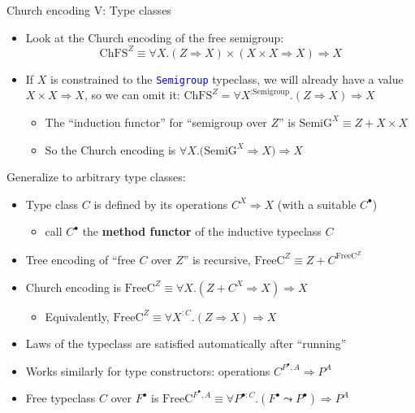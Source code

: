 \documentclass[english,,russian]{beamer}
\begin{document}
\begin{frame}{Church encoding V: Type classes}
\begin{itemize}
\item Look at the Church encoding of the free semigroup:{\footnotesize{}
\[
\text{ChFS}^{Z}\equiv\forall X.\left(Z\Rightarrow X\right)\times\left(X\times X\Rightarrow X\right)\Rightarrow X
\]
}{\footnotesize\par}
\item If $X$ is constrained to the \texttt{\textcolor{blue}{\footnotesize{}Semigroup}}
typeclass, we will already have a value {\footnotesize{}$X\times X\Rightarrow X$},
so we can omit it: {\footnotesize{}$\text{ChFS}^{Z}=\forall X^{:\text{Semigroup}}.\left(Z\Rightarrow X\right)\Rightarrow X$}{\footnotesize\par}
\begin{itemize}
\item The ``induction functor'' for ``semigroup over $Z$'' is {\footnotesize{}$\text{SemiG}^{X}\equiv Z+X\times X$}{\footnotesize\par}
\item So the Church encoding is $\forall X.\big(\text{SemiG}^{X}\Rightarrow X\big)\Rightarrow X$
\end{itemize}
\end{itemize}
Generalize to arbitrary type classes:
\begin{itemize}
\item Type class $C$ is defined by its operations{\footnotesize{} $C^{X}\Rightarrow X$}
(with a suitable $C^{\bullet}$)
\begin{itemize}
\item call $C^{\bullet}$ the \textbf{method functor} of the inductive typeclass
$C$
\end{itemize}
\item Tree encoding of ``free $C$ over $Z$'' is recursive, $\text{FreeC}^{Z}\equiv Z+C^{\text{FreeC}^{Z}}$
\item Church encoding is $\text{FreeC}^{Z}\equiv\forall X.\left(Z+C^{X}\Rightarrow X\right)\Rightarrow X$
\begin{itemize}
\item Equivalently, $\text{FreeC}^{Z}\equiv\forall X^{:C}.\left(Z\Rightarrow X\right)\Rightarrow X$
\end{itemize}
\item Laws of the typeclass are satisfied automatically after ``running''
\item Works similarly for type constructors: operations $C^{P^{\bullet},A}\Rightarrow P^{A}$
\item Free typeclass $C$ over $F^{\bullet}$ is $\text{FreeC}^{F^{\bullet},A}\equiv\forall P^{\bullet:C}.\left(F^{\bullet}\leadsto P^{\bullet}\right)\Rightarrow P^{A}$
\end{itemize}
\end{frame}
\end{document}
